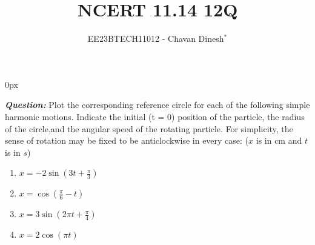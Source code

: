 \documentclass[journal,12pt,twocolumn]{IEEEtran}
\theoremstyle{remark}
\begin{document}
\parindent 0px

\vspace{3cm}

\title{NCERT 11.14 12Q}
\author{EE23BTECH11012 - Chavan Dinesh$^{*}$%
}
\maketitle
\newpage
\bigskip

\renewcommand{\thefigure}{\arabic{figure}}
\renewcommand{\thetable}{\arabic{table}}
\large\textbf{\textsl{Question:}}
Plot the corresponding reference circle for each of the following simple harmonic
motions. Indicate the initial (t = 0) position of the particle, the radius of the circle,and the angular speed of the rotating particle. For simplicity, the sense of rotation
may be fixed to be anticlockwise in every case: ($x$ is in cm and $t$ is in $s$)
\begin{enumerate}[label=\alph*)]
    \item $x = -2 \sin(3t + \frac{\pi}{3})$
    \item $x = \cos(\frac{\pi}{6} - t)$
    \item $x = 3 \sin(2\pi t + \frac{\pi}{4})$
    \item $x = 2 \cos(\pi t)$
\end{enumerate}

\solution
\end{document}
